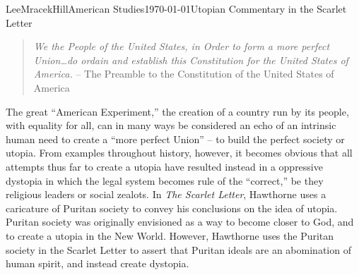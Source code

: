 \documentclass[12pt, letterpaper]{article}
\begin{document}
\begin{mla}{Lee}{Mracek}{Hill}{American Studies}{\today}{Utopian Commentary in the Scarlet Letter}
\begin{quotation}
\textit{We the People of the United States, in Order to form a more perfect Union\ldots do ordain and establish this Constitution for the United States of America.} -- The Preamble to the Constitution of the United States of America
\end{quotation}
The great ``American Experiment,'' the creation of a country run by its people, with equality for all, can in many ways be considered an echo of an intrinsic human need to create a ``more perfect Union'' -- to build the perfect society or utopia. From examples throughout history, however, it becomes obvious that all attempts thus far to create a utopia have resulted instead in a oppressive dystopia in which the legal system becomes rule of the ``correct,'' be they religious leaders or social zealots. In \textit{The Scarlet Letter}, Hawthorne uses a caricature of Puritan society to convey his conclusions on the idea of utopia. Puritan society was originally envisioned as a way to become closer to God, and to create a utopia in the New World. However, Hawthorne uses the Puritan society in the Scarlet Letter to assert that Puritan ideals are an abomination of human spirit, and instead create dystopia. \\
\end{mla}
\end{document}
